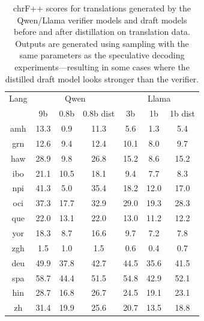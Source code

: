 \begin{table}[h!]
    \small
    \centering
    \begin{tabular}{c | c c c | c c c}
        \toprule
        Lang & \multicolumn{3}{c|}{Qwen} & \multicolumn{3}{c}{Llama} \\
        & 9b & 0.8b & 0.8b dist & 3b & 1b & 1b dist \\
        \midrule
        amh & 13.3 & 0.9 & 11.3 & 5.6 & 1.3 & 5.4 \\
        grn & 12.6 & 9.4 & 12.4 & 10.1 & 8.0 & 9.7 \\
        haw & 28.9 & 9.8 & 26.8 & 15.2 & 8.6 & 15.2 \\
        ibo & 21.1 & 10.5 & 18.1 & 9.4 & 7.7 & 8.3 \\
        npi & 41.3 & 5.0 & 35.4 & 18.2 & 12.0 & 17.0 \\
        oci & 37.3 & 17.7 & 32.9 & 29.0 & 19.3 & 28.3 \\
        que & 22.0 & 13.1 & 22.0 & 13.0 & 11.2 & 12.2 \\
        yor & 18.3 & 8.7 & 16.6 & 9.7 & 7.2 & 7.8 \\
        zgh & 1.5 & 1.0 & 1.5 & 0.6 & 0.4 & 0.7 \\
        \hline
        deu & 49.9 & 37.8 & 42.7 & 44.5 & 35.6 & 41.5 \\
        spa & 58.7 & 44.4 & 51.5 & 54.8 & 42.9 & 52.1 \\
        hin & 28.7 & 16.8 & 26.7 & 24.5 & 19.1 & 23.1 \\
        zh & 31.4 & 19.9 & 25.6 & 20.7 & 13.5 & 18.8 \\
        \bottomrule
    \end{tabular}
    \caption{chrF++ scores for translations generated by the Qwen/Llama verifier models and draft models before and after distillation on translation data. Outputs are generated using sampling with the same parameters as the speculative decoding experiments---resulting in some cases where the distilled draft model looks stronger than the verifier.}
    \label{tab:translation_scores}
\end{table}
